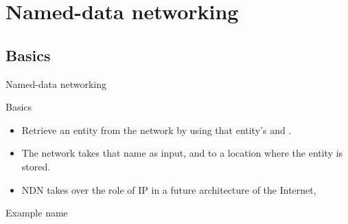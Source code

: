 \section{Named-data networking}
\subsection{Basics}
\begin{slide}{Named-data networking}
  \begin{centerfig}
  \end{centerfig}
  \begin{block}{Basics}
    \begin{itemize}\tightlist
    \item Retrieve an entity from the network by using that entity's  and .
    \item The network takes that name as input, and  to a location where the entity is
      stored.
    \item NDN takes over the role of IP in a future architecture of the Internet,
    \end{itemize}
  \end{block}
  \begin{exampleblock}{Example name}
  \end{exampleblock}
\end{slide}
